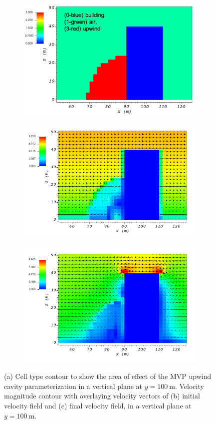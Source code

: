 \begin{figure}[H]
    \centering
    \begin{subfigure}{\textwidth}
    \centering
    \includegraphics[width=10.3cm,keepaspectratio]{Images/upwind_y_100_2_init_icell.png}
    \caption{}
    \end{subfigure}
    \begin{subfigure}{\textwidth}
    \centering
    \includegraphics[width=11.0cm,keepaspectratio]{Images/upwind_y_100_2_init_vel.png}
    \caption{}
    \end{subfigure}
    \begin{subfigure}{\textwidth}
    \centering
    \includegraphics[width=11.0cm,keepaspectratio]{Images/upwind_y_100_2_final.png}
    \caption{}
    \end{subfigure}
    \caption{(a) Cell type contour to show the area of effect of the MVP upwind cavity parameterization in a vertical plane at $y=100\ \si{\meter}$. Velocity magnitude contour with overlaying velocity vectors of (b) initial velocity field and (c) final velocity field, in a vertical plane at $y=100\ \si{\meter}$.}
\end{figure}

